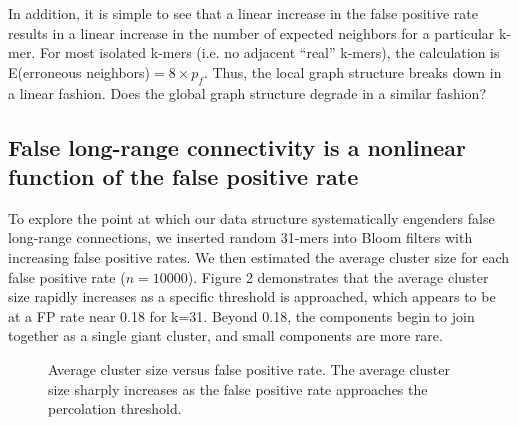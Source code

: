 \documentclass[12pt]{article} \usepackage{simplemargins}
\begin{document}
In addition, it is simple to see that a linear increase in the false 
positive rate results in a linear increase in the number of expected 
neighbors for a particular k-mer. For most isolated k-mers (i.e. no adjacent 
``real'' k-mers), the calculation is 
E(erroneous neighbors)$ = 8 \times p_f$. Thus, the local graph 
structure breaks down in a linear fashion.  Does the global graph structure
degrade in a similar fashion?

\subsection{False long-range connectivity is a nonlinear function of the false positive rate}

To explore the point at which our data structure systematically
engenders false long-range connections, we inserted random 31-mers
into Bloom filters with increasing false positive rates.  We then
estimated the average cluster size for each false positive rate
($n=10000$). Figure 2 demonstrates that the average cluster size
rapidly increases as a specific threshold is approached, which appears
to be at a FP rate near 0.18 for k=31. Beyond 0.18, the components
begin to join together as a single giant cluster, and small components
are more rare.

\begin{figure}
\caption{Average cluster size versus false positive rate. The average 
cluster size sharply increases as the false positive 
rate approaches the percolation threshold.
}
\end{figure}
\end{document}
